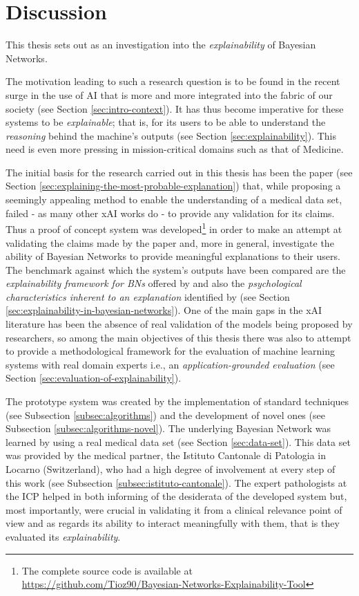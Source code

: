\section{Discussion}
This thesis sets out as an investigation into the \textit{explainability} of Bayesian Networks.

The motivation leading to such a research question is to be found in the recent surge in the use of AI that is more and more integrated into the fabric of our society (see Section \ref{sec:intro-context}).
It has thus become imperative for these systems to be \textit{explainable}; that is, for its users to be able to understand the \textit{reasoning} behind the machine's outputs (see Section \ref{sec:explainability}).
This need is even more pressing in mission-critical domains such as that of Medicine.

The initial basis for the research carried out in this thesis has been the paper \citep{Butz2018} (see Section \ref{sec:explaining-the-most-probable-explanation}) that, while proposing a seemingly appealing method to enable the understanding of a medical data set, failed - as many other xAI works do - to provide any validation for its claims.
Thus a proof of concept system was developed\footnote{The complete source code is available at \url{https://github.com/Tioz90/Bayesian-Networks-Explainability-Tool}} in order to make an attempt at validating the claims made by the paper and, more in general, investigate the ability of Bayesian Networks to provide meaningful explanations to their users.
The benchmark against which the system's outputs have been compared are the \textit{explainability framework for BNs} offered by \citet{lacave2002review} and also the \textit{psychological characteristics inherent to an explanation} identified by \citet{miller2018explanation} (see Section  \ref{sec:explainability-in-bayesian-networks}).
One of the main gaps in the xAI literature has been the absence of real validation of the models being proposed by researchers, so among the main objectives of this thesis there was also to attempt to provide a methodological framework for the evaluation of machine learning systems with real domain experts i.e., an \textit{application-grounded evaluation} \citep{doshi2017towards} (see Section \ref{sec:evaluation-of-explainability}).

The prototype system was created by the implementation of standard techniques (see Subsection \ref{subsec:algorithms}) and the development of novel ones (see Subsection \ref{subsec:algorithms-novel}).
The underlying Bayesian Network was learned by using a real medical data set (see Section \ref{sec:data-set}).
This data set was provided by the medical partner, the Istituto Cantonale di Patologia in Locarno (Switzerland), who had a high degree of involvement at every step of this work (see Subsection \ref{subsec:istituto-cantonale}).
The expert pathologists at the ICP helped in both informing of the desiderata of the developed system but, most importantly, were crucial in validating it from a clinical relevance point of view and as regards its ability to interact meaningfully with them, that is they evaluated its \textit{explainability}.

